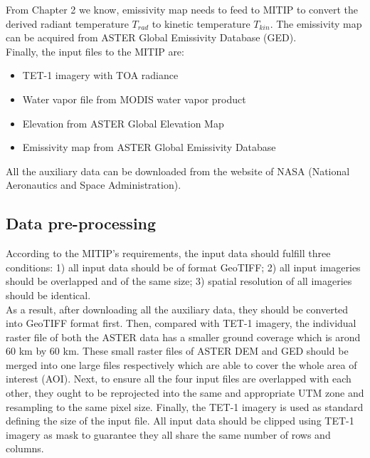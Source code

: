 \noindent From Chapter 2 we know, emissivity map needs to feed to MITIP to convert the derived radiant temperature $T_{rad}$ to kinetic temperature $T_{kin}$. The emissivity map can be acquired from ASTER Global Emissivity Database (GED).\\

\noindent Finally, the input files to the MITIP are:
\begin{itemize}
\item TET-1 imagery with TOA radiance
\item Water vapor file from MODIS water vapor product
\item Elevation from ASTER Global Elevation Map
\item Emissivity map from ASTER Global Emissivity Database
\end{itemize}

\noindent All the auxiliary data can be downloaded from the website of NASA (National Aeronautics and Space Administration).\\


\subsection{Data pre-processing}
According to the MITIP's requirements, the input data should fulfill three conditions: 1) all input data should be of format GeoTIFF; 2) all input imageries should be overlapped and of the same size; 3) spatial resolution of all imageries should be identical.\\

\noindent As a result, after downloading all the auxiliary data, they should be converted into GeoTIFF format first. Then, compared with TET-1 imagery, the individual raster file of both the ASTER data has a smaller ground coverage which is arond 60 km by 60 km. These small raster files of ASTER DEM and GED should be merged into one large files respectively which are able to cover the whole area of interest (AOI). Next, to ensure all the four input files are overlapped with each other, they ought to be reprojected into the same and appropriate UTM zone and resampling to the same pixel size. Finally, the TET-1 imagery is used as standard defining the size of the input file. All input data should be clipped using TET-1 imagery as mask to guarantee they all share the same number of rows and columns.\\ 

